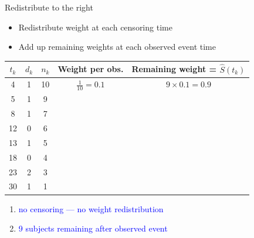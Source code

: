 \documentclass[10pt,t]{beamer}
\begin{document}
\begin{frame}{Redistribute to the right}
	
	\vspace{-5 mm}
	
	\begin{itemize}
		\item Redistribute weight at each censoring time
		
		\medskip
		\item Add up remaining weights at each observed event time
		
		\smallskip
	\end{itemize}
	\begin{footnotesize}
		\begin{center}
		\begin{tabular}{|c|c|c|c|c|}
			\hline
			$t_k$ & $d_k$ & $n_k$ & Weight per obs. & Remaining weight = $\widehat{S}(t_k)$ \\
			\hline
			4 & 1 & 10 & $\frac{1}{10} = 0.1$ & $9\times 0.1= 0.9$\\
			5 & 1 & 9 & & \\
			8 & 1 & 7 & & \\
			12 & 0 & 6 & & \\
			13 & 1 & 5 & & \\
			18 & 0 & 4 & & \\
			23 & 2 & 3 & & \\
			30 & 1 & 1 & & \\
			\hline
		\end{tabular}
	\end{center}
	\end{footnotesize}
\medskip

	\begin{enumerate}
		\item \textcolor{blue}{no censoring --- no weight redistribution}
		
		\medskip
		
		\item \textcolor{blue}{9 subjects remaining after observed event}
	\end{enumerate}
\end{frame}
\end{document}

